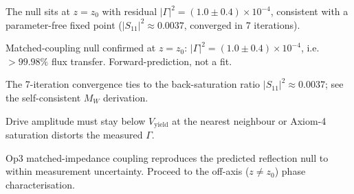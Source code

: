 \documentclass[11pt]{article}
\begin{document}

\analysis
The null sits at $z=z_0$ with residual $|\Gamma|^2 = (1.0\pm0.4)\times10^{-4}$,
consistent with a parameter-free fixed point ($|S_{11}|^2 \approx 0.0037$,
converged in 7 iterations).

\begin{averesult}
Matched-coupling null confirmed at $z=z_0$: $|\Gamma|^2 = (1.0\pm0.4)\times10^{-4}$,
i.e.\ $>99.98\%$ flux transfer. Forward-prediction, not a fit.
\end{averesult}

\begin{avenote}
The 7-iteration convergence ties to the back-saturation ratio
$|S_{11}|^2\approx0.0037$; see the self-consistent $M_W$ derivation.
\end{avenote}

\begin{avecaution}
Drive amplitude must stay below $V_\mathrm{yield}$ at the nearest
neighbour or Axiom-4 saturation distorts the measured $\Gamma$.
\end{avecaution}

\conclusion
Op3 matched-impedance coupling reproduces the predicted reflection null
to within measurement uncertainty. Proceed to the off-axis ($z\neq z_0$)
phase characterisation.

\witnessblock
\end{document}
